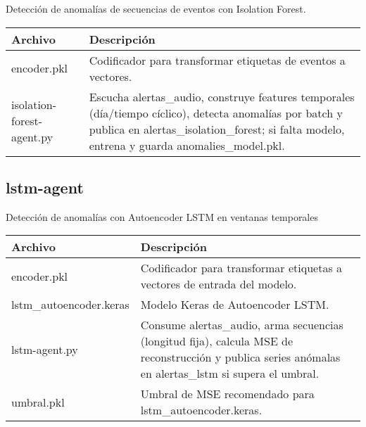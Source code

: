 Detección de anomalías de secuencias de eventos con Isolation Forest.

\begin{table}[H]
  \doublespacing
  \begin{tabularx}{\textwidth}{l X}
    \hline
    \textbf{Archivo}          & \textbf{Descripción}                                                                                                                                                         \\
    \hline
    encoder.pkl               &
    Codificador para transformar etiquetas de eventos a vectores.                                                                                                                                            \\
    isolation-forest-agent.py &
    Escucha alertas\_audio, construye features temporales (día/tiempo cíclico), detecta anomalías por batch y publica en alertas\_isolation\_forest; si falta modelo, entrena y guarda anomalies\_model.pkl. \\
    \hline
  \end{tabularx}
\end{table}

\subsection*{lstm-agent}

Detección de anomalías con Autoencoder LSTM en ventanas temporales

\begin{table}[H]
  \doublespacing
  \begin{tabularx}{\textwidth}{l X}
    \hline
    \textbf{Archivo}                             & \textbf{Descripción}                                                                                                                                   \\
    \hline
    encoder.pkl                                  & Codificador para transformar etiquetas a vectores de entrada del modelo.                                                                               \\
    lstm\_autoencoder.keras                     & Modelo Keras de Autoencoder LSTM.                                                                                                                      \\
    lstm-agent.py                                & Consume alertas\_audio, arma secuencias (longitud fija), calcula MSE de reconstrucción y publica series anómalas en alertas\_lstm si supera el umbral. \\
    umbral.pkl                                   & Umbral de MSE recomendado para lstm\_autoencoder.keras.                                                                                                \\
    \hline
  \end{tabularx}
\end{table}

